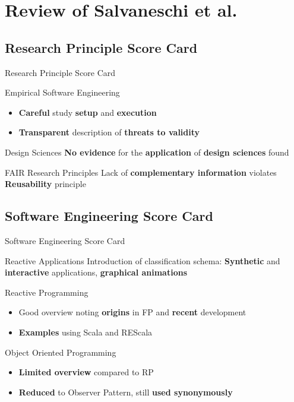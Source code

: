 \documentclass{beamer}
\begin{document}
\section{Review of Salvaneschi et al.}
\subsection*{Research Principle Score Card}
\begin{frame}{Research Principle Score Card}
	\begin{exampleblock}{Empirical Software Engineering}
		\begin{itemize}
			\item \textbf{Careful} study \textbf{setup} and \textbf{execution}
			\item \textbf{Transparent} description of \textbf{threats to validity}
		\end{itemize}
	\end{exampleblock}

	\begin{alertblock}{Design Sciences}
		\textbf{No evidence} for the \textbf{application} of \textbf{design sciences} found
	\end{alertblock}

	\begin{alertblock}{FAIR Research Principles}
		Lack of \textbf{complementary information} violates \textbf{Reusability} principle
	\end{alertblock}
\end{frame}

\subsection*{Software Engineering Score Card}
\begin{frame}{Software Engineering Score Card}
	\begin{exampleblock}{Reactive Applications}
		Introduction of classification schema: \textbf{Synthetic} and \textbf{interactive} applications, \textbf{graphical animations}
	\end{exampleblock}
	\begin{exampleblock}{Reactive Programming}
		\begin{itemize}
			\item Good overview noting \textbf{origins} in FP and \textbf{recent} development
			\item \textbf{Examples} using Scala and REScala
		\end{itemize}
	\end{exampleblock}

	\begin{alertblock}{Object Oriented Programming}
		\begin{itemize}
			\item \textbf{Limited overview} compared to RP
			\item \textbf{Reduced} to Observer Pattern, still \textbf{used synonymously}
		\end{itemize}
	\end{alertblock}
\end{frame}
\end{document}

